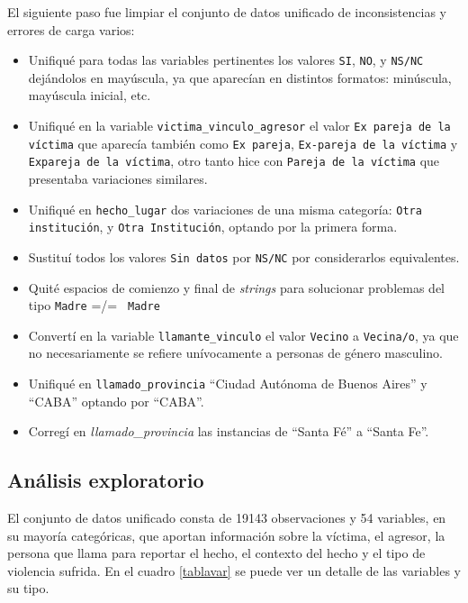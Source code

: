 \documentclass[10 pt]{article}
\begin{document}
El siguiente paso fue limpiar el conjunto de datos unificado de inconsistencias y errores de carga varios: 
\begin{itemize}
    \item Unifiqué para todas las variables pertinentes los valores \texttt{SI}, \texttt{NO}, y \texttt{NS/NC} dejándolos en mayúscula, ya que aparecían en distintos formatos: minúscula, mayúscula inicial, etc.
    \item Unifiqué en la variable \texttt{victima\_vinculo\_agresor} el valor \texttt{Ex pareja de la víctima} que aparecía también como \texttt{Ex pareja}, \texttt{Ex-pareja de la víctima} y \texttt{Expareja de la víctima}, otro tanto hice con \texttt{Pareja de la víctima} que presentaba variaciones similares.
    \item Unifiqué en \texttt{hecho\_lugar} dos variaciones de una misma categoría: \texttt{Otra institución}, y \texttt{Otra Institución}, optando por la primera forma.
    \item Sustituí todos los valores \texttt{Sin datos} por \texttt{NS/NC} por considerarlos equivalentes.
    \item Quité espacios de comienzo y final de \textit{strings} para solucionar problemas del tipo \texttt{Madre} =/= \texttt{  Madre} 
    \item Convertí en la variable \texttt{llamante\_vinculo} el valor \texttt{Vecino} a \texttt{Vecina/o}, ya que no necesariamente se refiere unívocamente a personas de género masculino.
    \item Unifiqué en \texttt{llamado\_provincia} “Ciudad Autónoma de Buenos Aires” y “CABA” optando por “CABA”. 
    \item Corregí en \textit{llamado\_provincia }las instancias de “Santa Fé” a “Santa Fe”.

\end{itemize}

\subsection{Análisis exploratorio}\label{exploración}

El conjunto de datos unificado consta de 19143 observaciones y 54 variables, en su mayoría categóricas, que aportan información sobre la víctima, el agresor, la persona que llama para reportar el hecho, el contexto del hecho y el tipo de violencia sufrida. En el cuadro \ref{tablavar} se puede ver un detalle de las variables y su tipo.
\end{document}
